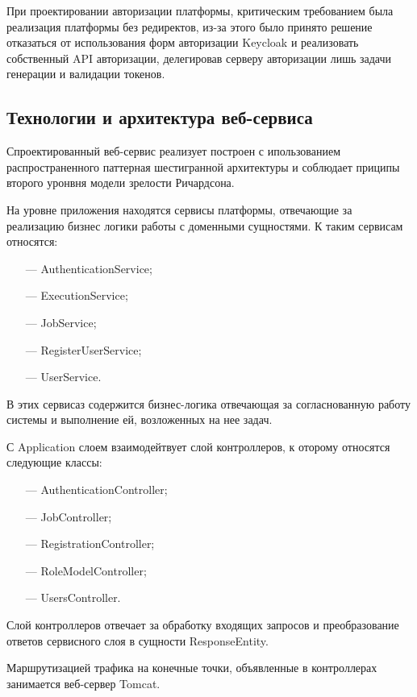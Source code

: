При проектировании авторизации платформы, критическим требованием была реализация платформы без редиректов, из-за этого было принято решение отказаться от использования форм авторизации Keycloak и реализовать собственный API авторизации, делегировав серверу авторизации лишь задачи генерации и валидации токенов.

\subsection{Технологии и архитектура веб-сервиса}

Спроектированный веб-сервис реализует построен с ипользованием распространенного паттерная шестигранной архитектуры\cite{richardson2023microservices} и соблюдает приципы второго уронвня модели зрелости Ричардсона\cite{salvadori2015maturity}. 

На уровне приложения находятся сервисы платформы, отвечающие за реализацию бизнес логики работы с доменными сущностями. К таким сервисам относятся:

\begin{itemize}
\item[---]AuthenticationService;
\item[---]ExecutionService;
\item[---]JobService;
\item[---]RegisterUserService;
\item[---]UserService.
\end{itemize}

В этих сервисаз содержится бизнес-логика отвечающая за согласнованную работу системы и выполнение ей, возложенных на нее задач.

С Application слоем взаимодейтвует слой контроллеров, к оторому относятся следующие классы:

\begin{itemize}
\item[---]AuthenticationController;
\item[---]JobController;
\item[---]RegistrationController;
\item[---]RoleModelController;
\item[---]UsersController.
\end{itemize}

Слой контроллеров отвечает за обработку входящих запросов и преобразование ответов сервисного слоя в сущности ResponseEntity.

Маршрутизацией трафика на конечные точки, объявленные в контроллерах занимается веб-сервер Tomcat.

